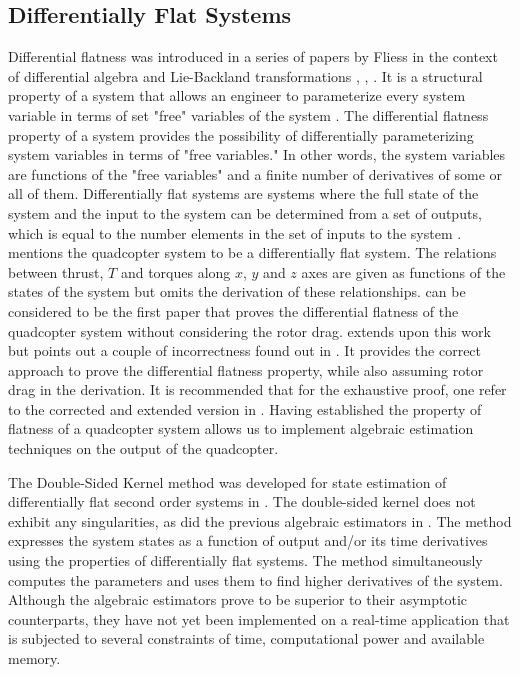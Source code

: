 \documentclass[letterpaper%
, twoside%
, 12pt%
,memoire%
, english%
,creativecommons,hyperref%
]{thETS}
\theoremstyle{newThmStyle}
\newcommand{\nocontentsline}[3]{}
\newcommand{\tocless}[2]{\bgroup\let\addcontentsline=\nocontentsline#1{#2}\egroup}
\begin{document}
\begin{introduction}
\tocless \subsection{Differentially Flat Systems} \label{subsec:diffflatnessquad}
Differential flatness was introduced in a series of papers by Fliess in the context of differential algebra and Lie-Backland transformations \citep{RN78}, \citep{RN79}, \citep{RN80}. It is a structural property of a system that allows an engineer to parameterize every system variable in terms of set "free" variables of the system \citep{RN77}. 
The differential flatness property of a system provides the possibility of differentially parameterizing system variables in terms of "free variables." In other words, the system variables are functions of the "free variables" and a finite number of derivatives of some or all of them.
Differentially flat systems are systems where the full state of the system and the input to the system can be determined from a set of outputs, which is equal to the number elements in the set of inputs to the system \citep{RN73}. 
\citep{RN81} mentions the quadcopter system to be a differentially flat system.  The relations between thrust, $T$ and torques along  $x$, $y$ and $z$ axes are given as functions of the states of the system but omits the derivation of these relationships. \citep{mellinger2011minimum} can be considered to be the first paper that proves the differential flatness of the quadcopter system without considering the rotor drag. \citep{faessler2017differential} extends upon this work but points out a couple of incorrectness found out in \citep{mellinger2011minimum}. It provides the correct approach to prove the differential flatness property, while also assuming rotor drag in the derivation. It is recommended that for the exhaustive proof, one refer to the corrected and extended version in \citep{faessler2017differential}. Having established the property of flatness of a quadcopter system allows us to implement algebraic estimation techniques on the output of the quadcopter. 

\tocless \subsection{Algebraic Differentiation and the Double Sided Kernel}
The Double-Sided Kernel method was developed for state estimation of differentially flat second order systems in \citep{RN76}. The double-sided kernel does not exhibit any singularities, as did the previous algebraic estimators in \citep{RN75}. The method expresses the system states as a function of output and/or its time derivatives using the properties of differentially flat systems. The method simultaneously computes the parameters and uses them to find higher derivatives of the system.\\
Although the algebraic estimators prove to be superior to their asymptotic counterparts, they have not yet been implemented on a real-time application that is subjected to several constraints of time, computational power and available memory. 


\end{introduction}
\end{document}
